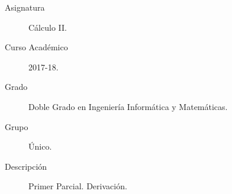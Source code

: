 \documentclass[12pt]{article}
\begin{document}

    
    

    \begin{description}
        \item[Asignatura] Cálculo II.
        \item[Curso Académico] 2017-18.
        \item[Grado] Doble Grado en Ingeniería Informática y Matemáticas.
        \item[Grupo] Único.
        \item[Descripción] Primer Parcial. Derivación.
    
    \end{description}
    \newpage
    
\end{document}
